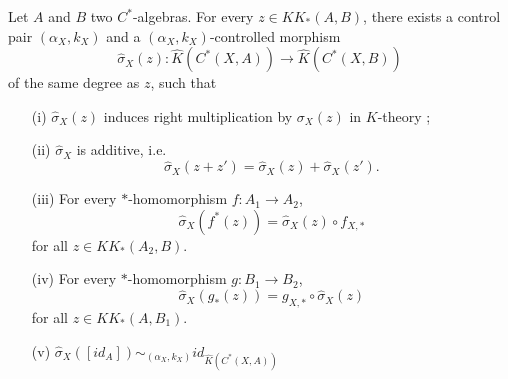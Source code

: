 
\begin{prop}
Let $A$ and $B$ two $C^*$-algebras. For every $z\in KK_*(A,B)$, there exists a control pair $(\alpha_X,k_X)$ and a $(\alpha_X,k_X)$-controlled morphism
\[\hat\sigma_X(z) : \hat K(C^*(X,A))\rightarrow \hat K(C^*(X,B))\]
of the same degree as $z$, such that
\begin{enumerate}
\item[(i)] $\hat\sigma_X(z)$ induces right multiplication by $\sigma_X(z)$ in $K$-theory ;
\item[(ii)] $\hat\sigma_X$ is additive, i.e.
\[\hat\sigma_X(z+z')=\hat\sigma_X(z)+\hat\sigma_X(z').\]
\item[(iii)] For every $*$-homomorphism $f : A_1\rightarrow A_2$,
\[\hat\sigma_X(f^*(z))=\hat\sigma_X(z)\circ f_{X,*}\] for all $z\in KK_*(A_2,B)$.
\item[(iv)] For every $*$-homomorphism $g : B_1\rightarrow B_2$,
\[\hat\sigma_X(g_*(z))= g_{X,*}\circ \hat\sigma_X(z)\] for all $z\in KK_*(A,B_1)$.
\item[(v)] $\hat\sigma_X([id_A]) \sim_{(\alpha_X,k_X)} id_{\hat K(C^*(X,A))}$
\end{enumerate}
\end{prop}

